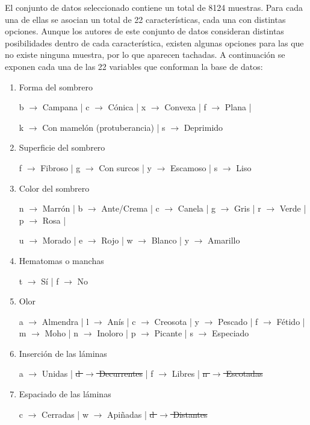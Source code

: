 \documentclass{Plantilla/Formato_EPEF}
\begin{document}
El conjunto de datos seleccionado contiene un total de 8124 muestras. Para cada una de ellas se asocian un total de 22 características, cada una con distintas opciones. Aunque los autores de este conjunto de datos consideran distintas posibilidades dentro de cada característica, existen algunas opciones para las que no existe ninguna muestra, por lo que aparecen tachadas. A continuación se exponen cada una de las 22 variables que conforman la base de datos:
\begin{enumerate}
	\item Forma del sombrero
	
	b $\rightarrow$ Campana | c $\rightarrow$ Cónica | x $\rightarrow$ Convexa | f $\rightarrow$ Plana |
	
	k $\rightarrow$ Con mamelón (protuberancia) | s $\rightarrow$ Deprimido
	
	\item Superficie del sombrero
	
	f $\rightarrow$ Fibroso | g $\rightarrow$ Con surcos | y $\rightarrow$ Escamoso | s $\rightarrow$ Liso
	
	\item Color del sombrero
	
	n $\rightarrow$ Marrón | b $\rightarrow$ Ante/Crema | c $\rightarrow$ Canela | g $\rightarrow$ Gris | r $\rightarrow$ Verde | p $\rightarrow$ Rosa |
	
	u $\rightarrow$ Morado | e $\rightarrow$ Rojo | w $\rightarrow$ Blanco | y $\rightarrow$ Amarillo
	
	\item Hematomas o manchas
	
	t $\rightarrow$ Sí | f $\rightarrow$ No
	
	\item Olor
	
	a $\rightarrow$ Almendra | l $\rightarrow$ Anís | c $\rightarrow$ Creosota | y $\rightarrow$ Pescado | f $\rightarrow$ Fétido | m $\rightarrow$ Moho | n $\rightarrow$ Inoloro | p $\rightarrow$ Picante | s $\rightarrow$ Especiado
	
	\item Inserción de las láminas
	
	a $\rightarrow$ Unidas | \sout{d $\rightarrow$ Decurrentes} | f $\rightarrow$ Libres | \sout{n $\rightarrow$ Escotadas}
	
	\item Espaciado de las láminas
	
	c $\rightarrow$ Cerradas | w $\rightarrow$ Apiñadas | \sout{d $\rightarrow$ Distantes}
	

\end{enumerate}
\end{document}

